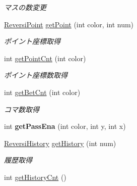 \begin{DoxyCompactItemize}
\begin{DoxyCompactList}\small\item\em マスの数変更 \end{DoxyCompactList}\item 
\mbox{\hyperlink{classjp_1_1gr_1_1java__conf_1_1yuta__yoshinaga_1_1reversi_1_1model_1_1_reversi_point}{Reversi\+Point}} \mbox{\hyperlink{classjp_1_1gr_1_1java__conf_1_1yuta__yoshinaga_1_1reversi_1_1model_1_1_reversi_ab180757b310c3a72cf159043ba0dc09e}{get\+Point}} (int color, int num)
\begin{DoxyCompactList}\small\item\em ポイント座標取得 \end{DoxyCompactList}\item 
int \mbox{\hyperlink{classjp_1_1gr_1_1java__conf_1_1yuta__yoshinaga_1_1reversi_1_1model_1_1_reversi_a8ab289d67a725a30e92411c90b755bd8}{get\+Point\+Cnt}} (int color)
\begin{DoxyCompactList}\small\item\em ポイント座標数取得 \end{DoxyCompactList}\item 
int \mbox{\hyperlink{classjp_1_1gr_1_1java__conf_1_1yuta__yoshinaga_1_1reversi_1_1model_1_1_reversi_a9f826e110ec3298a6bc5d6987a94519c}{get\+Bet\+Cnt}} (int color)
\begin{DoxyCompactList}\small\item\em コマ数取得 \end{DoxyCompactList}\item 
\mbox{\label{classjp_1_1gr_1_1java__conf_1_1yuta__yoshinaga_1_1reversi_1_1model_1_1_reversi_a418bc05a3aaa3252455e75d10e1d1441}} 
int {\bfseries get\+Pass\+Ena} (int color, int y, int x)
\item 
\mbox{\hyperlink{classjp_1_1gr_1_1java__conf_1_1yuta__yoshinaga_1_1reversi_1_1model_1_1_reversi_history}{Reversi\+History}} \mbox{\hyperlink{classjp_1_1gr_1_1java__conf_1_1yuta__yoshinaga_1_1reversi_1_1model_1_1_reversi_af781f5ebb4fb33b574ec58acfb45a796}{get\+History}} (int num)
\begin{DoxyCompactList}\small\item\em 履歴取得 \end{DoxyCompactList}\item 
int \mbox{\hyperlink{classjp_1_1gr_1_1java__conf_1_1yuta__yoshinaga_1_1reversi_1_1model_1_1_reversi_a286949e070d0cfc8a1d9562a298b7b98}{get\+History\+Cnt}} ()

\end{DoxyCompactItemize}
